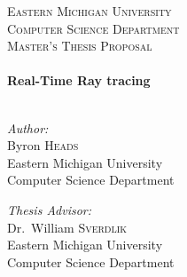\begin{titlepage}
    \begin{center}
        \textsc{\large Eastern Michigan University}\\[1.5cm]
        \textsc{\large Computer Science Department}\\
        \textsc{\large Master's Thesis Proposal}\\[0.5cm]
        \HRule\\[0.4cm]
        { \huge \bfseries  Real-Time Ray tracing }\\[0.4cm]
        \HRule\\[1.5cm]

        \begin{minipage}{0.45\textwidth}
            \begin{flushleft} \large
                \emph{Author:}\\
                Byron \textsc{Heads} \\
                \small Eastern Michigan University\\
                \small Computer Science Department \\
            \end{flushleft}
        \end{minipage}
        \begin{minipage}{0.45\textwidth}
            \begin{flushright} \large
                \emph{Thesis Advisor:} \\
                Dr.~William \textsc{Sverdlik}\\
                \small Eastern Michigan University\\
                \small Computer Science Department
            \end{flushright}
        \end{minipage}

        \vfill


\end{center}
\end{titlepage}
